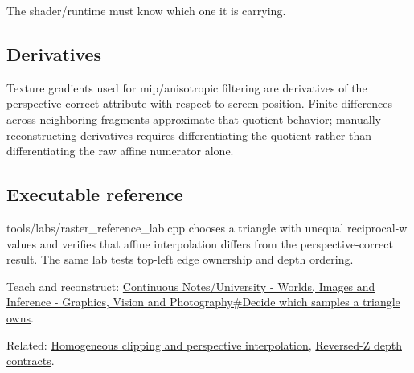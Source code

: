 The shader/runtime must know which one it is carrying.

\subsection{Derivatives}\label{appendix-1ed5f96c73ea-derivatives}

Texture gradients used for mip/anisotropic filtering are derivatives of the perspective-correct attribute with respect to screen position. Finite differences across neighboring fragments approximate that quotient behavior; manually reconstructing derivatives requires differentiating the quotient rather than differentiating the raw affine numerator alone.

\subsection{Executable reference}\label{appendix-1ed5f96c73ea-executable-reference}

tools/labs/raster\_reference\_lab.cpp chooses a triangle with unequal reciprocal-w values and verifies that affine interpolation differs from the perspective-correct result. The same lab tests top-left edge ownership and depth ordering.

Teach and reconstruct: \hyperref[03-visual-computing-i-ch012-decide-which-samples-a-triangle-owns]{Continuous Notes/University - Worlds, Images and Inference - Graphics, Vision and Photography\#Decide which samples a triangle owns}.

Related: \hyperref[appendix-40426e4b2103]{Homogeneous clipping and perspective interpolation}, \hyperref[appendix-275ec8847057]{Reversed-Z depth contracts}.
